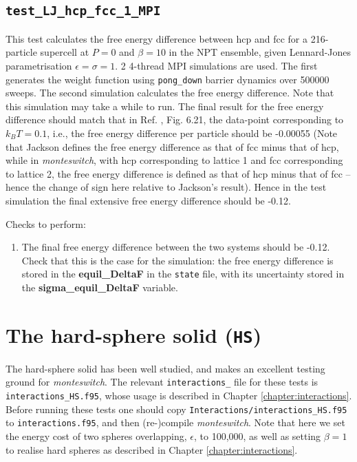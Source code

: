 \documentclass{report}
\begin{document}
\subsection{\texttt{test\_LJ\_hcp\_fcc\_1\_MPI}}
This test calculates the free energy difference between hcp and fcc for a 216-particle supercell at $P=0$ and
$\beta=10$ in the NPT ensemble, given Lennard-Jones parametrisation $\epsilon=\sigma=1$. 2 4-thread MPI simulations are used. 
The first generates the weight function using \texttt{pong\_down} barrier dynamics over 500000 sweeps. The second simulation calculates 
the free energy difference. Note that this simulation may take a while to run. The final result for the free energy difference
should match that in Ref. \cite{thesis:Jackson}, Fig. 6.21, the data-point corresponding to $k_BT=0.1$, i.e.,
the free energy difference per particle should be -0.00055 (Note that Jackson defines the free energy difference as
that of fcc minus that of hcp, while in \emph{monteswitch}, with hcp corresponding to lattice 1 and fcc corresponding to
lattice 2, the free energy difference is defined as that of hcp minus that of fcc -- hence the change of sign here
relative to Jackson's result). Hence in the test simulation the final extensive free energy difference should be -0.12.

Checks to perform:
\begin{enumerate}
\item
The final free energy difference between the two systems should be -0.12. Check that this is the case for the
simulation: the free energy difference is stored in the \textbf{equil\_DeltaF} in the \texttt{state} file, with its uncertainty
stored in the \textbf{sigma\_equil\_DeltaF} variable.
\end{enumerate}


\section{The hard-sphere solid (\texttt{HS})}
The hard-sphere solid has been well studied, and makes an excellent testing ground for \emph{monteswitch}.
The relevant \texttt{interactions\_} file for these tests is \texttt{interactions\_HS.f95}, whose usage is described in Chapter
\ref{chapter:interactions}. Before running these tests one should copy \texttt{Interactions/interactions\_HS.f95}
to \texttt{interactions.f95}, and then (re-)compile \emph{monteswitch}. Note that here we set the energy cost of two spheres overlapping,
$\epsilon$, to 100,000, as well as setting $\beta=1$ to realise hard spheres as described in Chapter \ref{chapter:interactions}.
\end{document}
